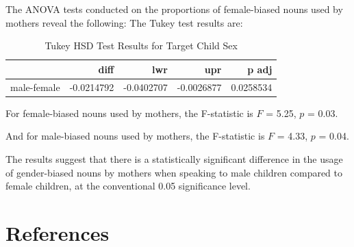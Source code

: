 \documentclass[
  man]{apa6}
\begin{document}
The ANOVA tests conducted on the proportions of female-biased nouns used by mothers reveal the following:
The Tukey test results are:

\begin{table}

\caption{\label{tab:unnamed-chunk-9}Tukey HSD Test Results for Target Child Sex}
\centering
\begin{tabular}[t]{l|r|r|r|r}
\hline
  & diff & lwr & upr & p adj\\
\hline
male-female & -0.0214792 & -0.0402707 & -0.0026877 & 0.0258534\\
\hline
\end{tabular}
\end{table}

For female-biased nouns used by mothers, the F-statistic is \(F\) = 5.25, \(p\) = 0.03.

And for male-biased nouns used by mothers, the F-statistic is \(F\) = 4.33, \(p\) = 0.04.

The results suggest that there is a statistically significant difference in the usage of gender-biased nouns by mothers when speaking to male children compared to female children, at the conventional 0.05 significance level.

\newpage

\hypertarget{references}{%
\section{References}\label{references}}

\begingroup
\setlength{\parindent}{-0.5in}
\setlength{\leftskip}{0.5in}
\end{document}
